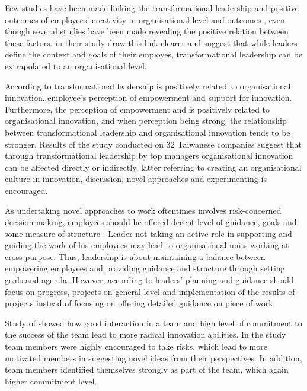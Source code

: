 Few studies have been made linking the transformational leadership and positive outcomes of employees' creativity in organisational level and outcomes \citep{jung2003role}, even though several studies have been made revealing the positive relation between these factors. in their study \citet{jung2003role} draw this link clearer and suggest that while leaders define the context and goals of their employes, transformational leadership can be extrapolated to an organisational level.  

According to \citet{jung2003role} transformational leadership is positively related to organisational innovation, employee's perception of empowerment and support for innovation. Furthermore, the perception of empowerment and is positively related to organisational innovation, and when perception being strong,  the relationship between transformational leadership and organisational innovation tends to be stronger. Results of the study conducted on 32 Taiwanese companies suggest that through transformational leadership by top managers organisational innovation can be affected directly or indirectly, latter referring to creating an organisational culture in innovation, discussion, novel approaches and experimenting is encouraged. \citep{jung2003role}

As undertaking novel approaches to work oftentimes involves risk-concerned decision-making, employees should be offered decent level of guidance, goals and some measure of structure \citep{jung2003role}. Leader not taking an active role in supporting and guiding the work of his employees may lead to organisational units working at cross-purpose. Thus, leadership is about maintaining a balance between empowering employees and providing guidance and structure through setting goals and agenda. However, according to \citet{mumford2002leading} leaders' planning and guidance should focus on progress, projects on general level and implementation of the results of projects instead of focusing on offering detailed guidance on piece of work. 

Study of \citet{sethi2001cross} showed how good interaction in a team and high level of commitment to the success of the team lead to more radical innovation abilities. In the study team members were highly encouraged to take risks, which lead to more motivated members in suggesting novel ideas from their perspectives. In addition, team members identified themselves strongly as part of the team, which again higher commitment level. \citep{sethi2001cross} 

